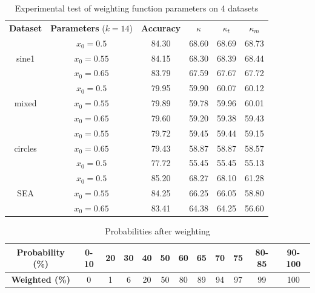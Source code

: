 \begin{table}
\caption{\label{table:weighting_experimental_test_all_datasets}Experimental test of weighting function parameters on 4 datasets}
\centering
\begin{tabular}{|c|c|c|c|c|c|}
\hline
\textbf{Dataset} & \textbf{Parameters} ($k=14$) & \textbf{Accuracy} & \textbf{$\kappa$} & \textbf{$\kappa_t$} & \textbf{$\kappa_m$} \\ \hhline{======}
& $x_0=0.5$    &    84.30    &    68.60    &    68.69    &    68.73\\ \cline{2-6}
sine1 & $x_0=0.55$    &    84.15    &    68.30    &    68.39    &    68.44\\ \cline{2-6}
 & $x_0=0.65$    &    83.79    &    67.59    &    67.67    &    67.72\\ \hhline{======}
 & $x_0=0.5$    &    79.95    &    59.90    &    60.07    &    60.12\\ \cline{2-6}
mixed & $x_0=0.55$    &    79.89    &    59.78    &    59.96    &    60.01\\ \cline{2-6}
 & $x_0=0.65$    &    79.60    &    59.20    &    59.38    &    59.43\\ \hhline{======}
 & $x_0=0.55$    &    79.72    &    59.45    &    59.44    &    59.15\\ \cline{2-6}
circles & $x_0=0.65$    &    79.43    &    58.87    &    58.87    &    58.57\\ \cline{2-6}
 & $x_0=0.5$    &    77.72    &    55.45    &    55.45    &    55.13\\ \hhline{======}
 & $x_0=0.5$    &    85.20    &    68.27    &    68.10    &    61.28\\ \cline{2-6}
SEA & $x_0=0.55$    &    84.25    &    66.25    &    66.05    &    58.80\\ \cline{2-6}
 & $x_0=0.65$    &    83.41    &    64.38    &    64.25    &    56.60\\ \hline
\end{tabular}
\end{table}

\begin{table}[]
\caption{\label{table:weight_probabilities}Probabilities after weighting}
\centering
\begin{tabular}{|c|c|c|c|c|c|c|c|c|c|c|c|}\\ \hhline{============}
\textbf{Probability (\%)} & 0-10&20&30&40&50&60&65&70&75&80-85&90-100 \\ \hline
\textbf{Weighted (\%)} & 0&1&6&20&50&80&89&94&97&99&100 \\ \hline
\end{tabular}
\end{table}

